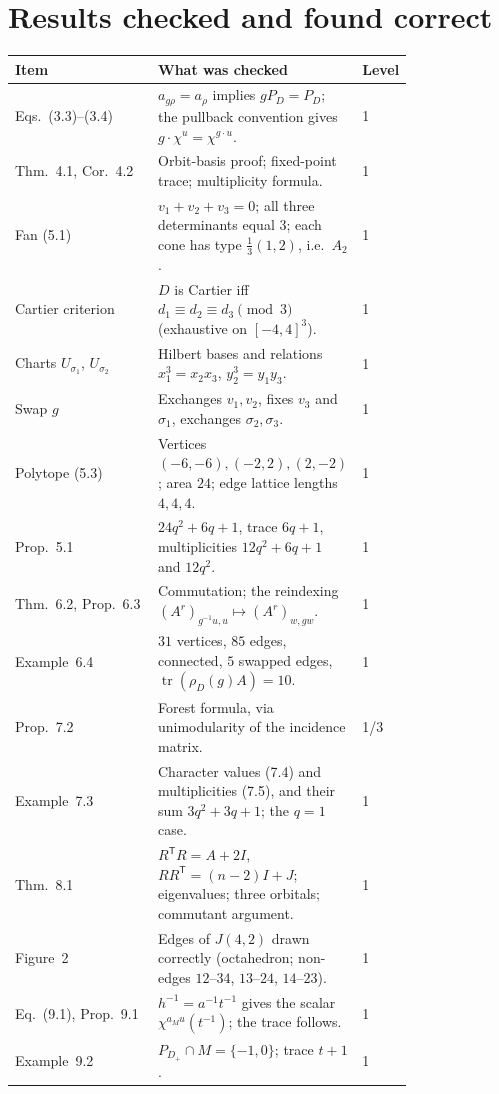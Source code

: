 \documentclass[12pt,letterpaper]{article}
\DeclareMathOperator{\tr}{tr}
\begin{document}
\section{Results checked and found correct}\label{sec:correct}
\begin{longtable}{@{}>{\raggedright\arraybackslash}p{0.36\linewidth}>{\raggedright\arraybackslash}p{0.43\linewidth}l@{}}
\toprule
Item & What was checked & Level\\\midrule
\endhead
Eqs.~(3.3)--(3.4) & $a_{g\rho}=a_\rho$ implies $gP_D=P_D$; the pullback convention gives $g\cdot\chi^u=\chi^{g\cdot u}$. & 1\\
Thm.~4.1, Cor.~4.2 & Orbit-basis proof; fixed-point trace; multiplicity formula. & 1\\
Fan (5.1) & $v_1+v_2+v_3=0$; all three determinants equal $3$; each cone has type $\tfrac13(1,2)$, i.e.\ $A_2$. & 1\\
Cartier criterion & $D$ is Cartier iff $d_1\equiv d_2\equiv d_3\pmod 3$ (exhaustive on $[-4,4]^3$). & 1\\
Charts $U_{\sigma_1}$, $U_{\sigma_2}$ & Hilbert bases and relations $x_1^3=x_2x_3$, $y_2^3=y_1y_3$. & 1\\
Swap $g$ & Exchanges $v_1,v_2$, fixes $v_3$ and $\sigma_1$, exchanges $\sigma_2,\sigma_3$. & 1\\
Polytope (5.3) & Vertices $(-6,-6),(-2,2),(2,-2)$; area $24$; edge lattice lengths $4,4,4$. & 1\\
Prop.~5.1 & $24q^2+6q+1$, trace $6q+1$, multiplicities $12q^2+6q+1$ and $12q^2$. & 1\\
Thm.~6.2, Prop.~6.3 & Commutation; the reindexing $(A^r)_{g^{-1}u,u}\mapsto(A^r)_{w,gw}$. & 1\\
Example~6.4 & $31$ vertices, $85$ edges, connected, $5$ swapped edges, $\tr(\rho_D(g)A)=10$. & 1\\
Prop.~7.2 & Forest formula, via unimodularity of the incidence matrix. & 1/3\\
Example~7.3 & Character values (7.4) and multiplicities (7.5), and their sum $3q^2+3q+1$; the $q=1$ case. & 1\\
Thm.~8.1 & $R^{\mathsf T}R=A+2I$, $RR^{\mathsf T}=(n-2)I+J$; eigenvalues; three orbitals; commutant argument. & 1\\
Figure~2 & Edges of $J(4,2)$ drawn correctly (octahedron; non-edges $12$--$34$, $13$--$24$, $14$--$23$). & 1\\
Eq.~(9.1), Prop.~9.1 & $h^{-1}=a^{-1}t^{-1}$ gives the scalar $\chi^{a_Mu}(t^{-1})$; the trace follows. & 1\\
Example~9.2 & $P_{D_+}\cap M=\{-1,0\}$; trace $t+1$. & 1\\
\bottomrule
\end{longtable}
\end{document}
